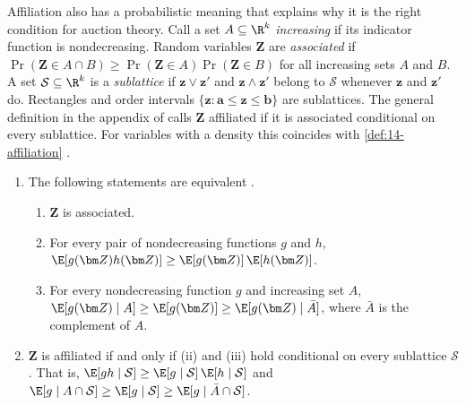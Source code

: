 Affiliation also has a probabilistic meaning that explains why it is the right condition for auction
theory. Call a set $A\subseteq\R^k$ \emph{increasing} if its indicator function is nondecreasing. Random
variables $\bm Z$ are \emph{associated} if $\Pr(\bm Z\in A\cap B)\ge\Pr(\bm Z\in A)\Pr(\bm Z\in B)$ for all
increasing sets $A$ and $B$. A set $\mathcal{S}\subseteq\R^k$ is a \emph{sublattice} if $\bm z\vee\bm z'$ and
$\bm z\wedge\bm z'$ belong to $\mathcal{S}$ whenever $\bm z$ and $\bm z'$ do. Rectangles and order intervals
$\{\bm z:\bm a\le\bm z\le\bm b\}$ are sublattices. The general definition in the appendix of
\citet{MilgromWeber1982} calls $\bm Z$ affiliated if it is associated conditional on every sublattice. For
variables with a density this coincides with \cref{def:14-affiliation} \citep[Theorem~24]{MilgromWeber1982}.

\begin{proposition}\label{prop:14-association}
\leavevmode
\begin{enumerate}[label=(\alph*)]
  \item The following statements are equivalent \citep[Theorem~22]{MilgromWeber1982}.
  \begin{enumerate}[label=(\roman*)]
    \item $\bm Z$ is associated.
    \item For every pair of nondecreasing functions $g$ and $h$, $\E[g(\bm Z)h(\bm Z)]\ge\E[g(\bm Z)]\,\E[h(\bm
    Z)]$.
    \item For every nondecreasing function $g$ and increasing set $A$, $\E[g(\bm Z)\mid A]\ge\E[g(\bm
    Z)]\ge\E[g(\bm Z)\mid \bar A]$, where $\bar A$ is the complement of $A$.
  \end{enumerate}
  \item $\bm Z$ is affiliated if and only if (ii) and (iii) hold conditional on every sublattice
  $\mathcal{S}$ \citep[Theorem~23]{MilgromWeber1982}. That is, $\E[gh\mid\mathcal{S}]\ge\E[g\mid\mathcal{S}]\,
  \E[h\mid\mathcal{S}]$ and $\E[g\mid A\cap\mathcal{S}]\ge\E[g\mid\mathcal{S}]\ge\E[g\mid\bar A\cap\mathcal{S}]$.
\end{enumerate}
\end{proposition}

